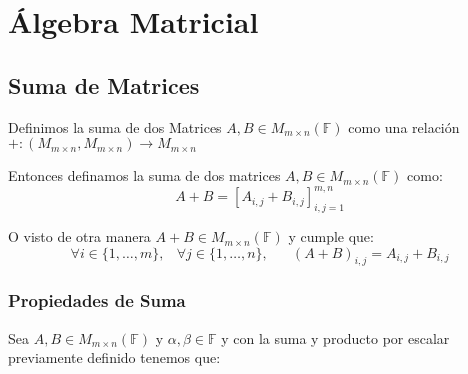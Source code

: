 \documentclass[12pt, fleqn]{report}                             %
\DeclareMathOperator \Space {\quad}                             %
\DeclareMathOperator \MiniSpace {\;}                            %
\begin{document}
    \clearpage
    \chapter{Álgebra Matricial}

        \clearpage
        \section{Suma de Matrices}

            Definimos la suma de dos Matrices $A, B \in M_{m \times n}(\mathbb{F})$ como una relación 
            \\ $+: (M_{m \times n}, M_{m \times n}) \to M_{m \times n}$

            Entonces definamos la suma de dos matrices $A, B \in M_{m \times n}(\mathbb{F})$ como:
            \begin{equation}
                A + B = [A_{i, j} + B_{i, j}]_{i, j = 1}^{m, n}
            \end{equation}

            O visto de otra manera $A + B \in M_{m \times n}(\mathbb{F})$ y cumple que:
            \begin{equation}
                \forall i \in \{1, \dots, m\} ,\MiniSpace
                    \forall j \in \{1, \dots, n\} ,\Space
                        (A+B)_{i, j} = A_{i, j} + B_{i, j}
            \end{equation}


            \subsection{Propiedades de Suma}

                Sea $A, B \in M_{m \times n}(\mathbb{F})$ y $\alpha, \beta \in \mathbb{F}$
                y con la suma y producto por escalar previamente definido tenemos que:
\end{document}
